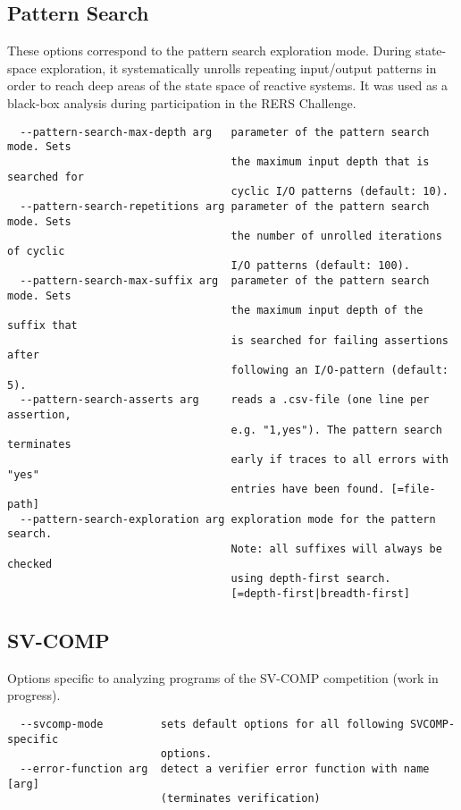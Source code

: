 \documentclass[natbib]{article}
\begin{document}
\subsection{Pattern Search}
These options correspond to the pattern search exploration mode. During state-space exploration, it systematically 
unrolls repeating input/output patterns in order to reach deep areas of the state space of reactive systems. It was 
used as a black-box analysis during participation in the RERS Challenge.
\begin{verbatim}
  --pattern-search-max-depth arg   parameter of the pattern search mode. Sets 
                                   the maximum input depth that is searched for
                                   cyclic I/O patterns (default: 10).
  --pattern-search-repetitions arg parameter of the pattern search mode. Sets 
                                   the number of unrolled iterations of cyclic 
                                   I/O patterns (default: 100).
  --pattern-search-max-suffix arg  parameter of the pattern search mode. Sets 
                                   the maximum input depth of the suffix that 
                                   is searched for failing assertions after 
                                   following an I/O-pattern (default: 5).
  --pattern-search-asserts arg     reads a .csv-file (one line per assertion, 
                                   e.g. "1,yes"). The pattern search terminates
                                   early if traces to all errors with "yes" 
                                   entries have been found. [=file-path]
  --pattern-search-exploration arg exploration mode for the pattern search. 
                                   Note: all suffixes will always be checked 
                                   using depth-first search. 
                                   [=depth-first|breadth-first]
\end{verbatim}


\subsection{SV-COMP}
Options specific to analyzing programs of the SV-COMP competition (work in progress).
\begin{verbatim}
  --svcomp-mode         sets default options for all following SVCOMP-specific 
                        options.
  --error-function arg  detect a verifier error function with name [arg] 
                        (terminates verification)
\end{verbatim}
\end{document}
